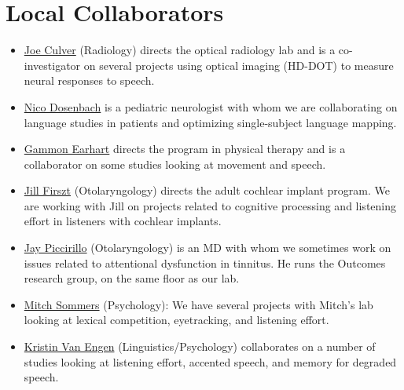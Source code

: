 \documentclass[letterpaper,12pt,oneside]{memoir}
\begin{document}
\section{Local Collaborators}
\begin{itemize}

\item \href{http://orl.wustl.edu/culver.html}{Joe Culver} (Radiology) directs the optical radiology lab and is a co-investigator on several projects using optical imaging (HD-DOT) to measure neural responses to speech.

\item \href{https://neuro.wustl.edu/about-us/physician-faculty-directory/nico-dosenbach-md/}{Nico Dosenbach} is a pediatric neurologist with whom we are collaborating on language studies in patients and optimizing single-subject language mapping.

\item \href{https://pt.wustl.edu/faculty-staff/faculty/gammon-m-earhart-pt-phd/}{Gammon Earhart} directs the program in physical therapy and is a collaborator on some studies looking at movement and speech.

\item \href{http://otocore.wustl.edu/firsztlab/Home.aspx}{Jill Firszt} (Otolaryngology) directs the adult cochlear implant program. We are working with Jill on projects related to cognitive processing and listening effort in listeners with cochlear implants.

\item \href{http://otooutcomes.wustl.edu}{Jay Piccirillo} (Otolaryngology) is an MD with whom we sometimes work on issues related to attentional dysfunction in tinnitus. He runs the Outcomes research group, on the same floor as our lab.

\item \href{http://psychweb.wustl.edu/sommers}{Mitch Sommers} (Psychology): We have several projects with Mitch's lab looking at lexical competition, eyetracking, and listening effort.

\item \href{http://kristinvanengen.wordpress.com}{Kristin Van Engen} (Linguistics/Psychology) collaborates on a number of studies looking at listening effort, accented speech, and memory for degraded speech.

\end{itemize}
\end{document}
